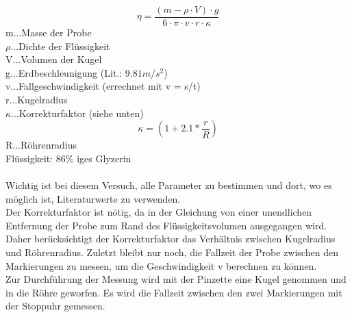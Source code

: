 \documentclass[12pt,a4paper]{article}
\begin{document}
\begin{multicols}{2}
$$\eta = \frac{(m-\rho \cdot V) \cdot g}{6 \cdot \pi \cdot v \cdot r \cdot \kappa}$$
m...Masse der Probe\\
$\rho$...Dichte der Flüssigkeit\\
V...Volumen der Kugel\\
g...Erdbeschleunigung (Lit.: $9.81m/s^2$)\\
v...Fallgeschwindigkeit (errechnet mit v = s/t)\\
r...Kugelradius\\
$\kappa$...Korrekturfaktor (siehe unten)\\
$$\kappa =  (1+2.1 * \frac{r}{R})$$
R...Röhrenradius\\
Flüssigkeit: 86\% iges Glyzerin\\
\\
Wichtig ist bei diesem Versuch, alle Parameter zu bestimmen und dort, wo es möglich ist, Literaturwerte zu verwenden. \\
Der Korrekturfaktor ist nötig, da in der Gleichung von einer unendlichen Entfernung der Probe zum Rand des Flüssigkeitsvolumen ausgegangen wird. \\
Daher berücksichtigt der Korrekturfaktor das Verhältnis zwischen Kugelradius und Röhrenradius. Zuletzt bleibt nur noch, die Fallzeit der Probe zwischen den Markierungen zu messen, um die Geschwindigkeit v berechnen zu können.\\
Zur Durchführung der Messung wird mit der Pinzette eine Kugel genommen und in die Röhre geworfen. Es wird die Fallzeit zwischen den zwei Markierungen mit der Stoppuhr gemessen.
\begin{figure}[H]
	\centering

\end{figure}
\end{multicols}
\end{document}
